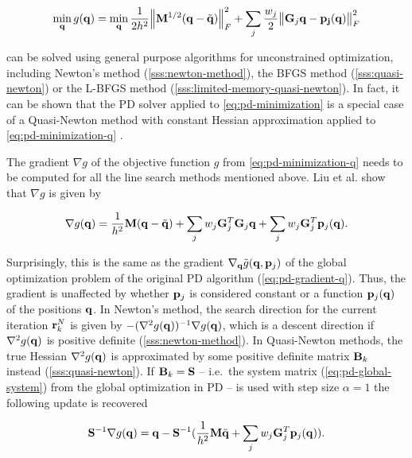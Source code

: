 \begin{equation}\label{eq:pd-minimization-q}
    \min_{\mathbf{q}} g(\mathbf{q}) = 
    \min_{\mathbf{q}} \frac{1}{2h^2} \norm{\mathbf{M}^{1/2}(\mathbf{q} - \tilde{\mathbf{q}})}^2_F + \sum_j \frac{w_j}{2} \norm{\mathbf{G}_j\mathbf{q}
    - \mathbf{p_j}(\mathbf{q})}^2_F
\end{equation}

\noindent can be solved using general purpose algorithms for unconstrained optimization, including Newton's method (\cref{sss:newton-method}),
the BFGS method (\cref{sss:quasi-newton}) or the L-BFGS method (\cref{sss:limited-memory-quasi-newton}). In fact, it can be shown that
the PD solver applied to \autoref{eq:pd-minimization} is a special case of a Quasi-Newton method with constant Hessian approximation 
applied to \autoref{eq:pd-minimization-q} \cite{liu2017}. 

The gradient $\nabla g$ of the objective function $g$ from \autoref{eq:pd-minimization-q} needs to be computed for all the line search 
methods mentioned above. Liu et al. \cite{liu2017} show that $\nabla g$ 
is given by

\begin{equation}\label{eq:pd-gradient-qn}
    \nabla g(\mathbf{q}) = \frac{1}{h^2}\mathbf{M}(\mathbf{q} - \tilde{\mathbf{q}}) + \sum_j w_j \mathbf{G}^T_j \mathbf{G}_j \mathbf{q}
    + \sum_j w_j \mathbf{G}^T_j \mathbf{p}_j(\mathbf{q}).
\end{equation}

Surprisingly, this is the same as the gradient $\nabla_{\mathbf{q}} \tilde{g}(\mathbf{q}, \mathbf{p}_j)$ of the global optimization problem of the original
PD algorithm (\cref{eq:pd-gradient-q}). Thus, the gradient is unaffected by whether $\mathbf{p}_j$ is considered constant or a function
$\mathbf{p}_j(\mathbf{q})$ of the positions $\mathbf{q}$. In Newton's method, the search direction for the current iteration $\mathbf{r}^N_k$ is given
by $-(\nabla^2 g(\mathbf{q}))^{-1} \nabla g(\mathbf{q})$, which is a descent direction if $\nabla^2 g(\mathbf{q})$ is positive definite 
(\cref{sss:newton-method}). In Quasi-Newton methods, the true Hessian $\nabla^2 g(\mathbf{q})$ is approximated by some positive definite matrix $\mathbf{B}_k$ 
instead (\cref{sss:quasi-newton}). If $\mathbf{B}_k = \mathbf{S}$ -- i.e.\ the system matrix 
(\cref{eq:pd-global-system}) from the global optimization in PD -- is used with step size $\alpha = 1$ the following update is recovered

\[
    \mathbf{S}^{-1} \nabla g(\mathbf{q}) = 
    \mathbf{q} - \mathbf{S}^{-1} 
    (\frac{1}{h^2}\mathbf{M}\tilde{\mathbf{q}} + \sum_j w_j \mathbf{G}_j^T \mathbf{p}_j(\mathbf{q})).
\]

